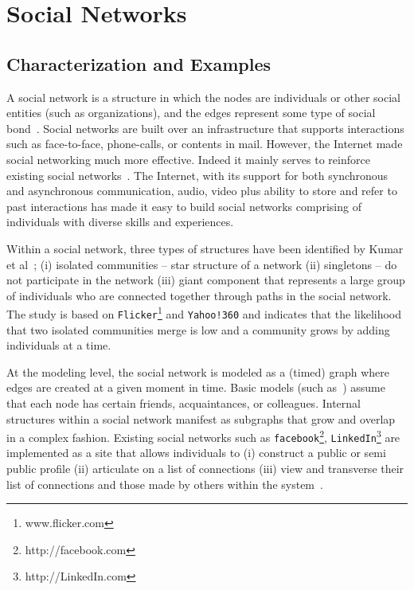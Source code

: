 \section{Social Networks} %
\label{sec:social_networks}

\subsection{Characterization and Examples} %
\label{sub:characterization_and_examples}

A social network is a structure in which the nodes are individuals or other social entities (such as organizations), and the edges represent some type of social bond~\cite{Boyd-Ellison:07}. Social networks are built over an infrastructure that supports interactions such as face-to-face, phone-calls, or contents in  mail. However, the Internet made social networking much more effective. Indeed it mainly serves to reinforce existing social networks~\cite{Kleinberg-Backstrom-Huttenlocher-Xiangyang:06}. The Internet, with its support for both synchronous and asynchronous communication, audio, video plus ability to store and refer to past interactions  has made it easy to build  social networks comprising of individuals with diverse skills and experiences.

Within a social network, three types of structures have been identified by Kumar et al~\cite{Kumar-Novak-Tomkins:06}; (i)
isolated communities -- star structure of a network (ii) singletons -- do not participate in the network (iii) giant
component that represents a large group of individuals who are connected together through paths in the social network.
The study is based on \texttt{Flicker}\footnote{www.flicker.com} and \texttt{Yahoo!360} and indicates that the likelihood
that two isolated communities merge is low and a community grows by adding individuals at a time.

At the modeling level, the social network is modeled as a (timed) graph where edges are created at a given moment in
time. Basic models (such as~\cite{Kleinberg-Backstrom-Huttenlocher-Xiangyang:06}) assume that each node has certain
friends, acquaintances, or colleagues. Internal structures within a social network manifest as subgraphs that grow and
overlap in a complex fashion. Existing social networks such as \texttt{facebook}\footnote{http://facebook.com},
\texttt{LinkedIn}\footnote{http://LinkedIn.com} are implemented as a site that allows individuals to (i) construct a
public or semi public profile (ii) articulate on a list of connections (iii) view and transverse their list of
connections and those made by others within the system~\cite{Boyd-Ellison:07}.

